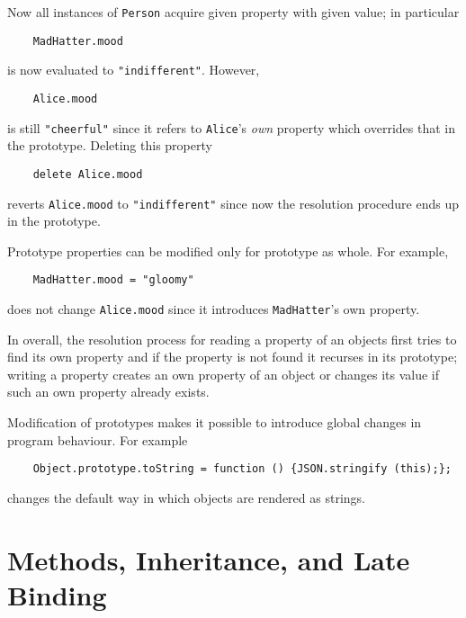 \documentclass{article}
\newcommand{\out}[1]{\texttt{#1}}
\begin{document}
Now all instances of \lstinline|Person| acquire given property with given value; in particular

\begin{lstlisting}
    MadHatter.mood
\end{lstlisting}

is now evaluated to \out{"indifferent"}. However,

\begin{lstlisting}
    Alice.mood
\end{lstlisting}

is still \out{"cheerful"} since it refers to \lstinline|Alice|'s \emph{own}
property which overrides that in the prototype. Deleting this property

\begin{lstlisting}
    delete Alice.mood
\end{lstlisting}

reverts \lstinline|Alice.mood| to \out{"indifferent"} since now the resolution
procedure ends up in the prototype.

Prototype properties can be modified only for prototype as whole. For example,

\begin{lstlisting}
    MadHatter.mood = "gloomy"
\end{lstlisting}

does not change \lstinline|Alice.mood| since it introduces \lstinline|MadHatter|'s own
property.

In overall, the resolution process for reading a property of an objects first
tries to find its own property and if the property is not found it recurses in
its prototype; writing a property creates an own property of an object or
changes its value if such an own property already exists. 

Modification of prototypes makes it possible to introduce global changes in
program behaviour. For example

\begin{lstlisting}
    Object.prototype.toString = function () {JSON.stringify (this);};
\end{lstlisting}

changes the default way in which objects are rendered as strings. 

\section{Methods, Inheritance, and Late Binding}
\label{sec:inheritance}
\end{document}
